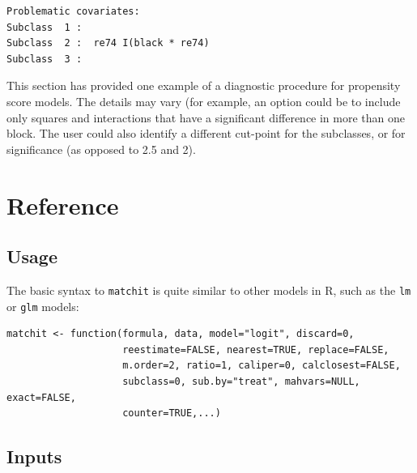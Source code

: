 \documentclass[oneside,letterpaper,titlepage]{article}
\begin{document}
\begin{verbatim}
Problematic covariates:
Subclass  1 :  
Subclass  2 :  re74 I(black * re74)
Subclass  3 :  
\end{verbatim}

This section has provided one example of a diagnostic procedure for
propensity score models.  The details may vary (for example, an option
could be to include only squares and interactions that have a
significant difference in more than one block.  The user could also
identify a different cut-point for the subclasses, or for significance
(as opposed to 2.5 and 2).

\section{Reference}

\subsection{Usage}

The basic syntax to \texttt{matchit} is quite similar to other models in R, such as the
\texttt{lm} or \texttt{glm} models: 

\begin{verbatim}
matchit <- function(formula, data, model="logit", discard=0,
                    reestimate=FALSE, nearest=TRUE, replace=FALSE,
                    m.order=2, ratio=1, caliper=0, calclosest=FALSE,
                    subclass=0, sub.by="treat", mahvars=NULL, exact=FALSE,
                    counter=TRUE,...)
\end{verbatim}

\subsection{Inputs}
\end{document}
